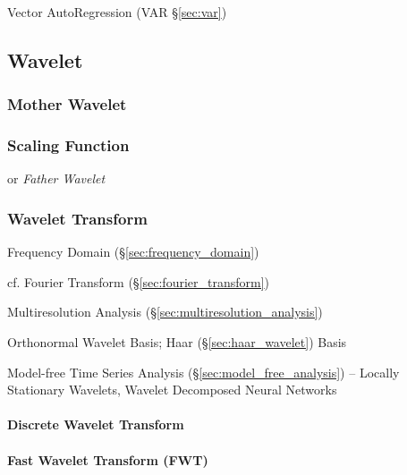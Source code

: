 Vector AutoRegression (VAR \S\ref{sec:var})



\subsection{Wavelet}\label{sec:wavelet}

\subsubsection{Mother Wavelet}\label{sec:mother_transform}

\subsubsection{Scaling Function}\label{sec:scaling_function}

or \emph{Father Wavelet}



\subsubsection{Wavelet Transform}\label{sec:wavelet_transform}

Frequency Domain (\S\ref{sec:frequency_domain})

cf. Fourier Transform (\S\ref{sec:fourier_transform})

Multiresolution Analysis (\S\ref{sec:multiresolution_analysis})

Orthonormal Wavelet Basis; Haar (\S\ref{sec:haar_wavelet}) Basis

Model-free Time Series Analysis (\S\ref{sec:model_free_analysis}) -- Locally
Stationary Wavelets, Wavelet Decomposed Neural Networks



\paragraph{Discrete Wavelet Transform}
\label{sec:discrete_wavelet_transform}\hfill

\paragraph{Fast Wavelet Transform (FWT)}\label{sec:fwt}\hfill




